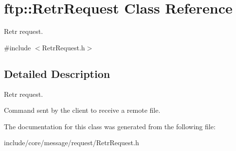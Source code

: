 \hypertarget{classftp_1_1_retr_request}{\section{ftp\-:\-:Retr\-Request Class Reference}
\label{classftp_1_1_retr_request}
}


Retr request.  




{\ttfamily \#include $<$Retr\-Request.\-h$>$}



\subsection{Detailed Description}
Retr request. 

Command sent by the client to receive a remote file. 

The documentation for this class was generated from the following file\-:\begin{DoxyCompactItemize}
\item 
include/core/message/request/Retr\-Request.\-h\end{DoxyCompactItemize}
